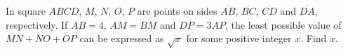 In square $ABCD$, $M$, $N$, $O$, $P$ are points on sides $\overline{AB}$, $\overline{BC}$, $\overline{CD}$ and $\overline{DA}$, respectively. If $AB = 4$, $AM = BM$ and $DP = 3AP$, the least possible value of $MN + NO + OP$ can be expressed as $\sqrt{x}$ for some positive integer $x$. Find $x$.
